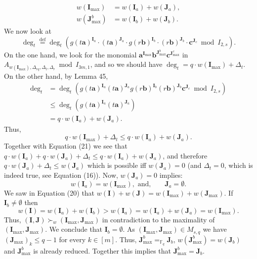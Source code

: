 \begin{align*}
w(\boldsymbol I_{\max})&=w(\boldsymbol I_a)+w(\boldsymbol J_a),\tag{21}\\
w(\boldsymbol J_{\max}^b)&=w(\boldsymbol I_b)+w(\boldsymbol J_b).\tag{22}
\end{align*}
We now look at
\[\deg_t\stackrel{\mathrm{def}}=\deg_t(g(t\boldsymbol a)^{\boldsymbol I_a}\cdot(t\boldsymbol a)^{\boldsymbol J_a}\cdot g(r\boldsymbol b)^{\boldsymbol I_b}\cdot(r\boldsymbol b)^{\boldsymbol J_b}\cdot\boldsymbol c^{\boldsymbol J_c}\bmod I_{2,s}).\]
On the one hand, we look for the monomial $\boldsymbol a^{\boldsymbol I_{\max}}\boldsymbol b^{\boldsymbol J_{\max}^b}\boldsymbol c^{\boldsymbol J_{\max}^c}$ in $A_{w(\boldsymbol I_{\max}),\Delta_{rq},\Delta_t,\Delta_r}\bmod I_{3m,1}$, and so we should have $\deg_t=q\cdot w(\boldsymbol I_{\max})+\Delta_t$. On the other hand, by Lemma 45,
\begin{align*}
\deg_t&=\deg_t(g(t\boldsymbol a)^{\boldsymbol I_a}(t\boldsymbol a)^{\boldsymbol J_a}g(r\boldsymbol b)^{\boldsymbol I_b}(r\boldsymbol b)^{\boldsymbol J_b}\boldsymbol c^{\boldsymbol J_c}\bmod I_{2,s})\\
&\leq\deg_t(g(t\boldsymbol a)^{\boldsymbol I_a}(t\boldsymbol a)^{\boldsymbol J_a})\\
&=q\cdot w(\boldsymbol I_a)+w(\boldsymbol J_a).
\end{align*}
Thus,
\[q\cdot w(\boldsymbol I_{\max})+\Delta_t\leq q\cdot w(\boldsymbol I_a)+w(\boldsymbol J_a).\]
Together with Equation (21) we see that $q\cdot w(\boldsymbol I_a)+q\cdot w(\boldsymbol J_a)+\Delta_t\leq q\cdot w(\boldsymbol I_a)+w(\boldsymbol J_a)$, and therefore $q\cdot w(\boldsymbol J_a)+\Delta_t\leq w(\boldsymbol J_a)$ which is possible iff $w(\boldsymbol J_a)=0$ (and $\Delta_t=0$, which is indeed true, see Equation (16)). Now, $w(\boldsymbol J_a)=0$ implies:
\[w(\boldsymbol I_a)=w(\boldsymbol I_{\max}),\text{ and,}\qquad\boldsymbol J_a=\emptyset.\]
We saw in Equation (20) that $w(\boldsymbol I)+w(\boldsymbol J)=w(\boldsymbol I_{\max})+w(\boldsymbol J_{\max})$. If $\boldsymbol I_b\neq\emptyset$ then
\[w(\boldsymbol I)=w(\boldsymbol I_a)+w(\boldsymbol I_b)>w(\boldsymbol I_a)=w(\boldsymbol I_a)+w(\boldsymbol J_a)=w(\boldsymbol I_{\max}).\]
Thus, $(\boldsymbol I,\boldsymbol J)\succ_w(\boldsymbol I_{\max},\boldsymbol J_{\max})$ in contradiction to the maximality of $(\boldsymbol I_{\max},\boldsymbol J_{\max})$. We conclude that $\boldsymbol I_b=\emptyset$.
As $(\boldsymbol I_{\max},\boldsymbol J_{\max})\in M_{s,q}$ we have $(\boldsymbol J_{\max})_k\leq q-1$ for every $k\in[m]$. Thus, $\boldsymbol J_{\max}^b=_{\mathbb F_q}\boldsymbol J_b$, $w(\boldsymbol J_{\max}^b)=w(\boldsymbol J_b)$ and $\boldsymbol J_{\max}^b$ is already reduced. Together this implies that $\boldsymbol J_{\max}^b=\boldsymbol J_b$.
